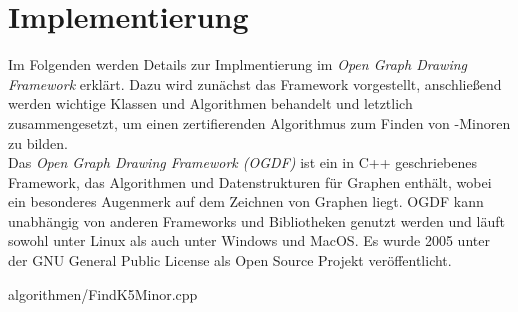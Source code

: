 \chapter{Implementierung}
\label{cha:implementierung}

Im Folgenden werden Details zur Implmentierung im \emph{Open Graph Drawing Framework} erklärt.
Dazu wird zunächst das Framework vorgestellt, anschließend werden wichtige Klassen und Algorithmen behandelt und letztlich zusammengesetzt, um einen zertifierenden Algorithmus zum Finden von \kf-Minoren zu bilden.
\ \\

Das \emph{Open Graph Drawing Framework (OGDF)} ist ein in C++ geschriebenes Framework, das Algorithmen und Datenstrukturen für Graphen enthält, wobei ein besonderes Augenmerk auf dem Zeichnen von Graphen liegt.
OGDF kann unabhängig von anderen Frameworks und Bibliotheken genutzt werden und läuft sowohl unter Linux als auch unter Windows und MacOS.
Es wurde 2005 unter der GNU General Public License als Open Source Projekt veröffentlicht\cite{OGDFAbout}\cite{CGJK+2014}.

\newpage
\begin{minipage}{\linewidth}

                {algorithmen/FindK5Minor.cpp}
\end{minipage}
